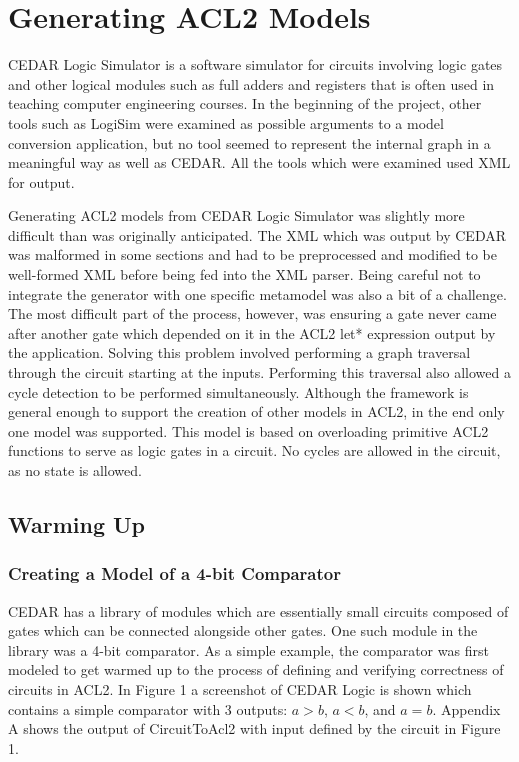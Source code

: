 \documentclass[fleqn,10pt]{SelfArx} %
\begin{document}
\section{Generating ACL2 Models}
CEDAR Logic Simulator\cite{cedar} is a software simulator for circuits involving logic gates and other logical modules such as full adders and registers that is often used in teaching computer engineering courses. In the beginning of the project, other tools such as LogiSim were examined as possible arguments to a model conversion application, but no tool seemed to represent the internal graph in a meaningful way as well as CEDAR. All the tools which were examined used XML for output.

Generating ACL2 models from CEDAR Logic Simulator was slightly more difficult than was originally anticipated. The XML which was output by CEDAR was malformed in some sections and had to be preprocessed and modified to be well-formed XML before being fed into the XML parser. Being careful not to integrate the generator with one specific metamodel was also a bit of a challenge. The most difficult part of the process, however, was ensuring a gate never came after another gate which depended on it in the ACL2 let* expression output by the application. Solving this problem involved performing a graph traversal through the circuit starting at the inputs. Performing this traversal also allowed a cycle detection to be performed simultaneously. Although the framework is general enough to support the creation of other models in ACL2, in the end only one model was supported. This model is based on overloading primitive ACL2 functions to serve as logic gates in a circuit. No cycles are allowed in the circuit, as no state is allowed.

\subsection{Warming Up}
\subsubsection{Creating a Model of a 4-bit Comparator}
CEDAR has a library of modules which are essentially small circuits composed of gates which can be connected alongside other gates. One such module in the library was a 4-bit comparator. As a simple example, the comparator was first modeled to get warmed up to the process of defining and verifying correctness of circuits in ACL2. In Figure 1 a screenshot of CEDAR Logic is shown which contains a simple comparator with 3 outputs: $a>b$, $a<b$, and $a=b$. Appendix A shows the output of CircuitToAcl2 with input defined by the circuit in Figure 1.
\end{document}
